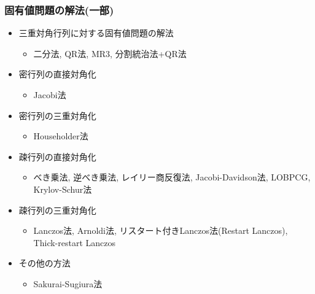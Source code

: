 \begin{frame}
  \frametitle{固有値問題の解法(一部)}
  \begin{itemize}
  \item 三重対角行列に対する固有値問題の解法
    \begin{itemize}
      \item 二分法, QR法, MR3, 分割統治法+QR法
    \end{itemize}
  \item 密行列の直接対角化
    \begin{itemize}
      \item Jacobi法
    \end{itemize}
  \item 密行列の三重対角化
    \begin{itemize}
      \item Householder法
    \end{itemize}
  \item 疎行列の直接対角化
    \begin{itemize}
      \item べき乗法, 逆べき乗法, レイリー商反復法, Jacobi-Davidson法, LOBPCG, Krylov-Schur法
    \end{itemize}
  \item 疎行列の三重対角化
    \begin{itemize}
      \item Lanczos法, Arnoldi法, リスタート付きLanczos法(Restart Lanczos), Thick-restart Lanczos
    \end{itemize}
  \item その他の方法
    \begin{itemize}
      \item Sakurai-Sugiura法
    \end{itemize}
  \end{itemize}
\end{frame}

